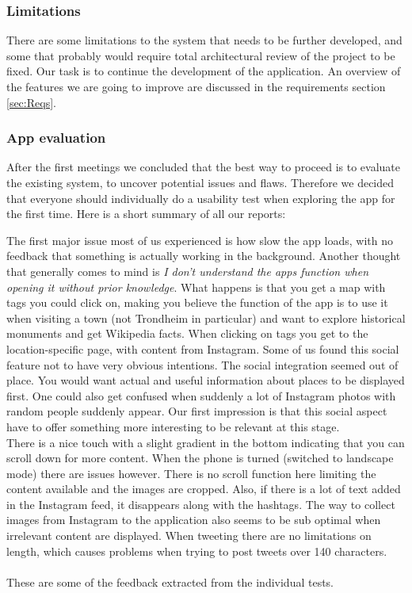 		\subsubsection{Limitations}
There are some limitations to the system that needs to be further developed, and some that probably would require total architectural review of the project to be fixed. Our task is to continue the development of the application. An overview of the features we are going to improve are discussed in the requirements section \ref{sec:Reqs}. 

		\subsubsection{App evaluation}
		
After the first meetings we concluded that the best way to proceed is to evaluate the existing system, to uncover potential issues and flaws.
Therefore we decided that everyone should individually do a usability test when exploring the app for the first time. Here is a short summary of all our reports:

The first major issue most of us experienced is how slow the app loads, with no feedback that something is actually working in the background. Another thought that generally comes to mind is \emph{I don't understand the apps function when opening it without prior knowledge}. What happens is that you get a map with tags you could click on, making you believe the function of the app is to use it when visiting a town (not Trondheim in particular) and want to explore historical monuments and get Wikipedia facts. When clicking on tags you get to the location-specific page, with content from Instagram. Some of us found this social feature not to have very obvious intentions. The social integration seemed out of place. You would want actual and useful information about places to be displayed first. One could also get confused when suddenly a lot of Instagram photos with random people suddenly appear. Our first impression is that this social aspect have to offer something more interesting to be relevant at this stage. 
\\
There is a nice touch with a slight gradient in the bottom indicating that you can scroll down for more content. When the phone is turned (switched to landscape mode) there are issues however. There is no scroll function here limiting the content available and the images are cropped. Also, if there is a lot of text added in the Instagram feed, it disappears along with the hashtags. The way to collect images from Instagram to the application also seems to be sub optimal when irrelevant content are displayed. When tweeting there are no limitations on length, which causes problems when trying to post tweets over 140 characters.\\
\\
These are some of the feedback extracted from the individual tests. 

